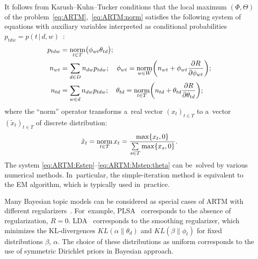 \documentclass{acm_proc_article-sp}
\newcommand{\norm}{\mathop{\rm norm}\limits}
\newcommand{\cond}{\mspace{3mu}{|}\mspace{3mu}}
\begin{document}
It follows from Karush--Kuhn--Tucker conditions
that the \mbox{local} maximum $(\Phi,\Theta)$
of the problem~\eqref{eq:ARTM},~\eqref{eq:ARTM:norm}
satisfies the following system of equations
with auxiliary variables interpreted as conditional probabilities
${p_{tdw} = p(t\cond d,w)}$~\cite{voron14aist}:
\begin{align}
    \label{eq:ARTM:Estep}
    p_{tdw} &= \norm_{t\in T} \bigl(\phi_{wt}\theta_{td}\bigr);
\\
    \label{eq:ARTM:Mstep:phi}
    n_{wt} &= \sum_{d\in D} n_{dw} p_{tdw};\quad
    \phi_{wt} = \norm_{w\in W}
        \biggl(
            n_{wt} + \phi_{wt} \frac{\partial R}{\partial \phi_{wt}}
        \biggr);
\\
    \label{eq:ARTM:Mstep:theta}
    n_{td} &= \sum_{w\in d} n_{dw} p_{tdw};\quad
    \theta_{td} = \norm_{t\in T}
        \biggl(
            n_{td} + \theta_{td} \frac{\partial R}{\partial \theta_{td}}
        \biggr);
\end{align}
where the ``norm'' operator transforms
a~real vector $(x_t)_{t\in T}$ to
a~vector $(\tilde x_t)_{t\in T}$ of discrete distribution:
\[
    \tilde x_t = \norm_{t\in T} x_t = \frac{\max\{x_t,0\}}{\sum\limits_{s\in T} \max\{x_s,0\}}.
\]
The system \eqref{eq:ARTM:Estep}--\eqref{eq:ARTM:Mstep:theta}
can be~solved by various numerical methods.
In~particular,
the simple-iteration method is equivalent to the EM algorithm,
which is typically used in~practice.

Many Bayesian topic models can be considered
as special cases of ARTM with different regularizers~\cite{voron14aist,voron14mlj}.
For~example,
PLSA~\cite{hofmann99plsi} corresponds to the absence of regularization, ${R=0}$.
LDA~\cite{blei03latent} corresponds to the smoothing regularizer,
which minimizes the KL-divergences
$KL(\alpha\|\theta_d)$ and
$KL(\beta\|\phi_t)$
for fixed distributions $\beta$, $\alpha$.
The choice of these distributions as uniform
corresponds to the use of symmetric Dirichlet priors in Bayesian approach.
\end{document}
